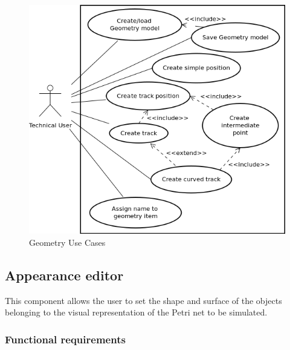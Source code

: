\begin{figure}[htp]
\begin{center}
  \includegraphics[scale=0.5]{image/uc_geometry.png}
  \caption{Geometry Use Cases}
  \label{fig:geometry_use_cases}
\end{center}
\end{figure}

\subsection{Appearance editor}

This component allows the user to set the shape and surface of the objects
belonging to the visual representation of the Petri net to be simulated.

\subsubsection{Functional requirements}

